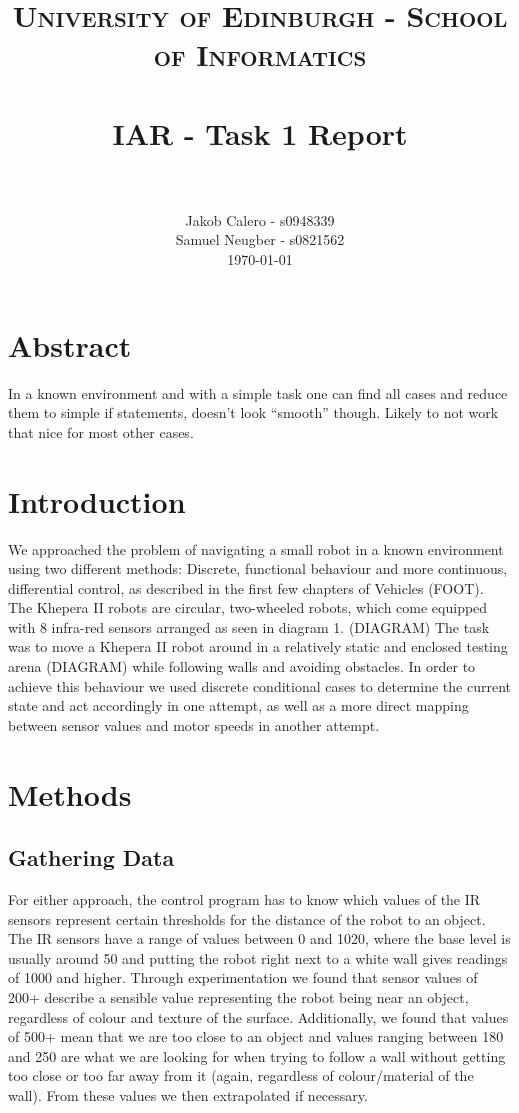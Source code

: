 \documentclass[paper=a4, fontsize=12pt]{scrartcl}	%
\title{
\vspace{-1in} 	
\usefont{OT1}{bch}{b}{n}
\normalfont \normalsize \textsc{University of Edinburgh - School of Informatics} \\ [25pt]
\horrule{0.5pt} \\[0.4cm]
\large IAR - Task 1 Report \\
\horrule{1pt} \\[0.5cm]
}
\author{
  \normalfont \normalsize
  Jakob Calero - s0948339\\[-3pt]\normalsize
  Samuel Neugber - s0821562\\[-3pt]\normalsize
  \today
}
\date{}
\numberwithin{equation}{section}		%
\numberwithin{figure}{section}			%
\numberwithin{table}{section}				%
\begin{document}
\maketitle					%
\section{Abstract}
In a known environment and with a simple task one can find all cases and reduce them to simple if statements, doesn't look “smooth” though. Likely to not work that nice for most other cases.

\section{Introduction}
We approached the problem of navigating a small robot in a known environment using two different methods: Discrete, functional behaviour and more continuous, differential control, as described in the first few chapters of Vehicles (FOOT). The Khepera II robots are circular, two-wheeled robots, which come equipped with 8 infra-red sensors arranged as seen in diagram 1. (DIAGRAM) The task was to move a Khepera II robot around in a relatively static and enclosed testing arena (DIAGRAM) while following walls and avoiding obstacles. In order to achieve this behaviour we used discrete conditional cases to determine the current state and act accordingly in one attempt, as well as a more direct mapping between sensor values and motor speeds in another attempt.

\section{Methods}
\subsection{Gathering Data}
For either approach, the control program has to know which values of the IR sensors represent certain thresholds for the distance of the robot to an object. The IR sensors have a range of values between 0 and 1020, where the base level is usually around 50 and putting the robot right next to a white wall gives readings of 1000 and higher. Through experimentation we found that sensor values of 200+ describe a sensible value representing the robot being near an object, regardless of colour and texture of the surface. Additionally, we found that values of 500+ mean that we are too close to an object and values ranging between 180 and 250 are what we are looking for when trying to follow a wall without getting too close or too far away from it (again, regardless of colour/material of the wall). From these values we then extrapolated if necessary.
\end{document}
